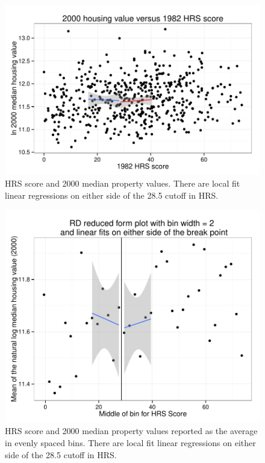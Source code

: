 \documentclass[letterpaper, 12pt]{article}
\begin{document}
\begin{figure}[htbp!]
\begin{center}
\includegraphics{fig-4.pdf}
\caption{HRS score and 2000 median property values.  There are local fit linear regressions on either side of the 28.5 cutoff in HRS.}
\label{fig:4}
\end{center}
\end{figure}

\begin{figure}[htbp!]
\begin{center}
\includegraphics{fig-locavg-2000.pdf}
\caption{HRS score and 2000 median property values reported as the average in evenly spaced bins.  There are local fit linear regressions on either side of the 28.5 cutoff in HRS.}
\label{fig:4b}
\end{center}
\end{figure}
\end{document}
